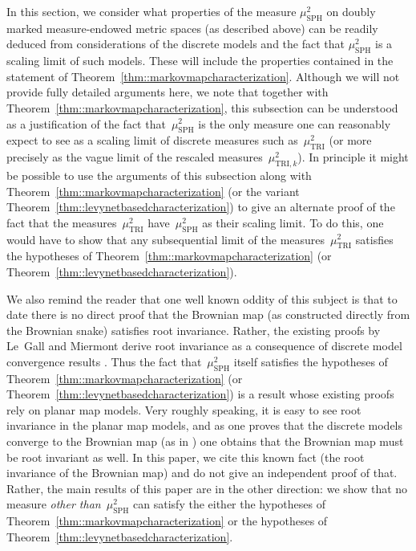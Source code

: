 \documentclass[10pt]{amsart}
\theoremstyle{plain}
\numberwithin{theorem}{section}
\theoremstyle{definition}
\newcommand{\mustwo}{\mu_{\mathrm{SPH}}^2}
\begin{document}
In this section, we consider what properties of the measure $\mustwo$ on doubly marked measure-endowed metric spaces (as described above) can be readily deduced from considerations of the discrete models and the fact that $\mustwo$ is a scaling limit of such models. These will include the properties contained in the statement of Theorem~\ref {thm::markovmapcharacterization}. Although we will not provide fully detailed arguments here, we note that together with Theorem~\ref {thm::markovmapcharacterization}, this subsection can be understood as a justification of the fact that~$\mustwo$ is the only measure one can reasonably expect to see as a scaling limit of discrete measures such as~$\mu^2_{\mathrm{TRI}}$ (or more precisely as the vague limit of the rescaled measures~$\mu^2_{\mathrm{TRI},k}$). In principle it might be possible to use the arguments of this subsection along with Theorem~\ref {thm::markovmapcharacterization} (or the variant Theorem~\ref{thm::levynetbasedcharacterization}) to give an alternate proof of the fact that the measures~$\mu^2_{\mathrm{TRI}}$ have~$\mustwo$ as their scaling limit. To do this, one would have to show that any subsequential limit of the measures~$\mu^2_{\mathrm{TRI}}$ satisfies the hypotheses of Theorem~\ref {thm::markovmapcharacterization} (or Theorem~\ref{thm::levynetbasedcharacterization}).

We also remind the reader that one well known oddity of this subject is that to date there is no direct proof that the Brownian map (as constructed directly from the Brownian snake) satisfies root invariance. Rather, the existing proofs by Le~Gall and Miermont derive root invariance as a consequence of discrete model convergence results \cite{legallgeodesics, legalluniqueanduniversal, miermontlimit, legalluniversallimit}. Thus the fact that~$\mustwo$ itself satisfies the hypotheses of Theorem~\ref {thm::markovmapcharacterization} (or Theorem~\ref{thm::levynetbasedcharacterization}) is a result whose existing proofs rely on planar map models. Very roughly speaking, it is easy to see root invariance in the planar map models, and as one proves that the discrete models converge to the Brownian map (as in \cite{legalluniqueanduniversal, miermontlimit, legalluniversallimit}) one obtains that the Brownian map must be root invariant as well. In this paper, we cite this known fact (the root invariance of the Brownian map) and do not give an independent proof of that. Rather, the main results of this paper are in the other direction: we show that no measure \emph{other than}~$\mustwo$ can satisfy the either the hypotheses of Theorem~\ref {thm::markovmapcharacterization} or the hypotheses of Theorem~\ref{thm::levynetbasedcharacterization}.
\end{document}
